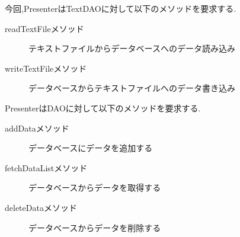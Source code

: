\documentclass[uplatex,12pt]{jsarticle}
\begin{document}
\noindent
今回,PresenterはTextDAOに対して以下のメソッドを要求する.
\begin{description}
    \item[readTextFileメソッド] テキストファイルからデータベースへのデータ読み込み
    \item[writeTextFileメソッド] データベースからテキストファイルへのデータ書き込み
\end{description}
PresenterはDAOに対して以下のメソッドを要求する.
\begin{description}
    \item[addDataメソッド] データベースにデータを追加する
    \item[fetchDataListメソッド] データベースからデータを取得する
    \item[deleteDataメソッド] データベースからデータを削除する
\end{description}
\end{document}
